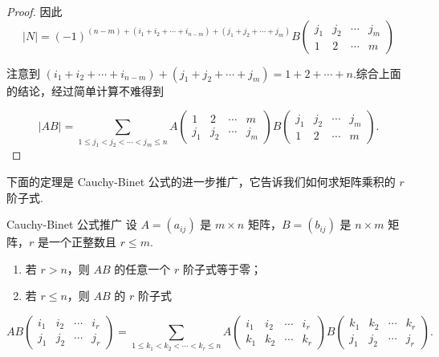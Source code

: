 \begin{proof}
    因此
    $$ |N| = (-1)^{(n-m) + (i_1 + i_2 + \cdots + i_{n-m}) + (j_1 + j_2 + \cdots + j_m)} B
    \begin{pmatrix}
        j_1 & j_2 & \cdots & j_m \\
        1 & 2 & \cdots & m
    \end{pmatrix}
    $$

    注意到 $ (i_1 + i_2 + \cdots + i_{n-m}) + (j_1 + j_2 + \cdots + j_m) = 1 + 2 + \cdots + n $.综合上面的结论，经过简单计算不难得到

    $$ |AB| = \sum_{1 \leqslant j_1 < j_2 < \cdots < j_m \leqslant n} A
    \begin{pmatrix}
        1 & 2 & \cdots & m \\
        j_1 & j_2 & \cdots & j_m
    \end{pmatrix}
    B
    \begin{pmatrix}
        j_1 & j_2 & \cdots & j_m \\
        1 & 2 & \cdots & m
    \end{pmatrix}.
    $$
\end{proof}

下面的定理是 Cauchy-Binet 公式的进一步推广，它告诉我们如何求矩阵乘积的 $r$ 阶子式.

\begin{theorem}{}{Cauchy-Binet 公式推广}
    设 $A = (a_{ij})$ 是 $m \times n$ 矩阵，$B = (b_{ij})$ 是 $n \times m$ 矩阵，$r$ 是一个正整数且 $r \leqslant m$.
    \begin{enumerate}
        \item 若 $r > n$，则 $AB$ 的任意一个 $r$ 阶子式等于零；
        \item 若 $r \leqslant n$，则 $AB$ 的 $r$ 阶子式
    \end{enumerate}
    \[
        AB
        \begin{pmatrix}
            i_1 & i_2 & \cdots & i_r \\
            j_1 & j_2 & \cdots & j_r
        \end{pmatrix}
        = \sum_{1 \leqslant k_1 < k_2 < \cdots < k_r \leqslant n} A
        \begin{pmatrix}
            i_1 & i_2 & \cdots & i_r \\
            k_1 & k_2 & \cdots & k_r
        \end{pmatrix}
        B
        \begin{pmatrix}
            k_1 & k_2 & \cdots & k_r \\
            j_1 & j_2 & \cdots & j_r
        \end{pmatrix}.
    \]
\end{theorem}

